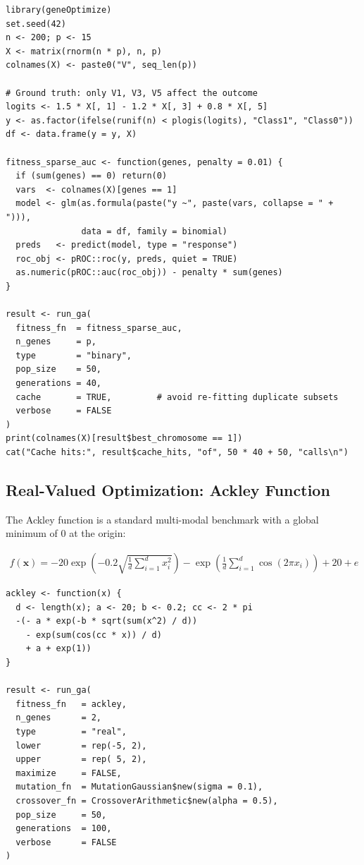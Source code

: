 \documentclass[11pt,a4paper]{article}
\begin{document}
\begin{lstlisting}
library(geneOptimize)
set.seed(42)
n <- 200; p <- 15
X <- matrix(rnorm(n * p), n, p)
colnames(X) <- paste0("V", seq_len(p))

# Ground truth: only V1, V3, V5 affect the outcome
logits <- 1.5 * X[, 1] - 1.2 * X[, 3] + 0.8 * X[, 5]
y <- as.factor(ifelse(runif(n) < plogis(logits), "Class1", "Class0"))
df <- data.frame(y = y, X)

fitness_sparse_auc <- function(genes, penalty = 0.01) {
  if (sum(genes) == 0) return(0)
  vars  <- colnames(X)[genes == 1]
  model <- glm(as.formula(paste("y ~", paste(vars, collapse = " + "))),
               data = df, family = binomial)
  preds   <- predict(model, type = "response")
  roc_obj <- pROC::roc(y, preds, quiet = TRUE)
  as.numeric(pROC::auc(roc_obj)) - penalty * sum(genes)
}

result <- run_ga(
  fitness_fn  = fitness_sparse_auc,
  n_genes     = p,
  type        = "binary",
  pop_size    = 50,
  generations = 40,
  cache       = TRUE,         # avoid re-fitting duplicate subsets
  verbose     = FALSE
)
print(colnames(X)[result$best_chromosome == 1])
cat("Cache hits:", result$cache_hits, "of", 50 * 40 + 50, "calls\n")
\end{lstlisting}

\subsection{Real-Valued Optimization: Ackley Function}

The Ackley function \citep{Ackley1987} is a standard multi-modal benchmark
with a global minimum of $0$ at the origin:

\begin{align}
  f(\mathbf{x}) = -20\exp\!\left(-0.2\sqrt{\tfrac{1}{d}\sum_{i=1}^{d}x_i^2}\right)
  - \exp\!\left(\tfrac{1}{d}\sum_{i=1}^{d}\cos(2\pi x_i)\right) + 20 + e
\end{align}

\begin{lstlisting}
ackley <- function(x) {
  d <- length(x); a <- 20; b <- 0.2; cc <- 2 * pi
  -(- a * exp(-b * sqrt(sum(x^2) / d))
    - exp(sum(cos(cc * x)) / d)
    + a + exp(1))
}

result <- run_ga(
  fitness_fn   = ackley,
  n_genes      = 2,
  type         = "real",
  lower        = rep(-5, 2),
  upper        = rep( 5, 2),
  maximize     = FALSE,
  mutation_fn  = MutationGaussian$new(sigma = 0.1),
  crossover_fn = CrossoverArithmetic$new(alpha = 0.5),
  pop_size     = 50,
  generations  = 100,
  verbose      = FALSE
)
\end{lstlisting}
\end{document}
